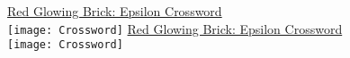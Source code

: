 \documentclass[white]{GL2020}
\begin{document}
\name{\wCrosswordEpsilon{}}

\vspace*{0.5cm}
\begin{center}
{\LARGE \underline{Red Glowing Brick: Epsilon Crossword}}\\
\vspace{0.5cm}
\texttt{[image: Crossword]}
\vfill
{\LARGE \underline{Red Glowing Brick: Epsilon Crossword}}\\
\vspace{0.5cm}
\texttt{[image: Crossword]}
\end{center}
\end{document}
